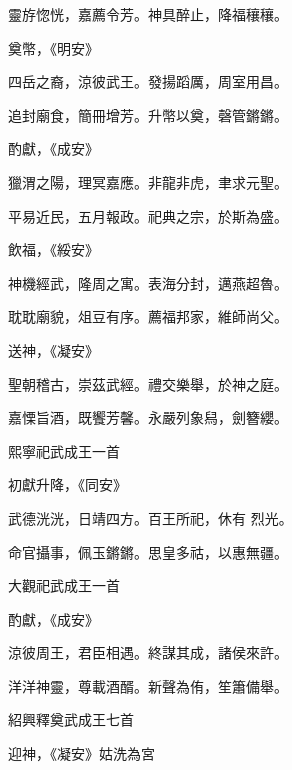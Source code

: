 \begin{pinyinscope}
 靈斿惚恍，嘉薦令芳。神具醉止，降福穰穰。



 奠幣，《明安》



 四岳之裔，涼彼武王。發揚蹈厲，周室用昌。



 追封廟食，簡冊增芳。升幣以奠，磬管鏘鏘。



 酌獻，《成安》



 獵渭之陽，理冥嘉應。非龍非虎，聿求元聖。



 平易近民，五月報政。祀典之宗，於斯為盛。



 飲福，《綏安》



 神機經武，隆周之寓。表海分封，邁燕超魯。



 耽耽廟貌，俎豆有序。薦福邦家，維師尚父。



 送神，《凝安》



 聖朝稽古，崇茲武經。禮交樂舉，於神之庭。



 嘉慄旨酒，既饗芳馨。永嚴列象舄，劍簪纓。



 熙寧祀武成王一首



 初獻升降，《同安》



 武德洸洸，日靖四方。百王所祀，休有
 烈光。



 命官攝事，佩玉鏘鏘。思皇多祜，以惠無疆。



 大觀祀武成王一首



 酌獻，《成安》



 涼彼周王，君臣相遇。終謀其成，諸侯來許。



 洋洋神靈，尊載酒醑。新聲為侑，笙簫備舉。



 紹興釋奠武成王七首



 迎神，《凝安》姑洗為宮




\end{pinyinscope}

